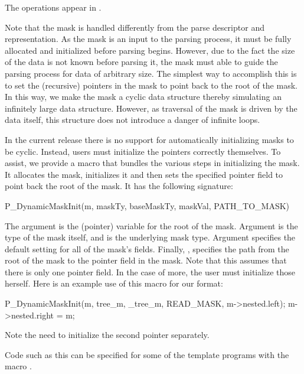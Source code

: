 The operations appear in .

Note that the mask is handled differently from the parse descriptor
and representation. As the mask is an input to the parsing process, it
must be fully allocated and initialized before parsing begins.
However, due to the fact the size of the data is not known before
parsing it, the mask must able to guide the parsing process for data
of arbitrary size. The simplest way to accomplish this is to set the
(recursive) pointers in the mask to point back to the root of the
mask. In this way, we make the mask a cyclic data structure thereby
simulating an infinitely large data structure. However, as traversal
of the mask is driven by the data itself, this structure does not
introduce a danger of infinite loops.

In the current release there is no support for automatically
initializing masks to be cyclic. Instead, users must initialize the
pointers correctly themselves. To assist, we provide a macro that
bundles the various steps in initializing the mask. It allocates the
mask, initializes it and then sets the specified pointer field to
point back the root of the mask. It has the following signature:

\begin{code}
P_DynamicMaskInit(m, maskTy, baseMaskTy, maskVal, PATH_TO_MASK)
\end{code}

The argument  is the (pointer) variable for the root of
the mask. Argument  is the type of the mask itself, and
 is the underlying mask type. Argument 
specifies the default setting for all of the mask's fields. Finally,
, specifies the path from the root of the mask to
the pointer field in the mask. Note that this assumes that there is
only one pointer field. In the case of more, the user must initialize
those herself. Here is an example use of this macro for our 
format:
\begin{code}
P_DynamicMaskInit(m, tree_m, _tree_m, READ_MASK, m->nested.left);
m->nested.right = m;
\end{code}
Note the need to initialize the second pointer separately. 

Code such as this can be specified for some of the template programs
with the macro .

